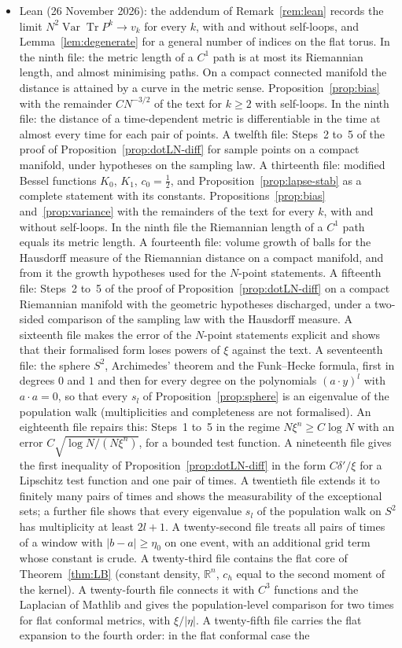 \documentclass[11pt,a4paper]{article}
\theoremstyle{stmt}
\theoremstyle{defn}
\theoremstyle{rmk}
\numberwithin{equation}{section}
\DeclareMathOperator{\Tr}{Tr}
\newcommand{\R}{\mathbb{R}}
\begin{document}
\begin{itemize}
\item Lean (26 November 2026): the addendum of Remark~\ref{rem:lean} records the limit $N^2\operatorname{Var}\Tr P^k\to v_k$ for every $k$, with and without self-loops, and Lemma~\ref{lem:degenerate} for a general number of indices on the flat torus. In the ninth file: the metric length of a $C^1$ path is at most its Riemannian length, and almost minimising paths. On a compact connected manifold the distance is attained by a curve in the metric sense. Proposition~\ref{prop:bias} with the remainder $CN^{-3/2}$ of the text for $k\ge2$ with self-loops. In the ninth file: the distance of a time-dependent metric is differentiable in the time at almost every time for each pair of points. A twelfth file: Steps~2 to~5 of the proof of Proposition~\ref{prop:dotLN-diff} for sample points on a compact manifold, under hypotheses on the sampling law. A thirteenth file: modified Bessel functions $K_0$, $K_1$, $c_0=\frac12$, and Proposition~\ref{prop:lapse-stab} as a complete statement with its constants. Propositions~\ref{prop:bias} and~\ref{prop:variance} with the remainders of the text for every $k$, with and without self-loops. In the ninth file the Riemannian length of a $C^1$ path equals its metric length. A fourteenth file: volume growth of balls for the Hausdorff measure of the Riemannian distance on a compact manifold, and from it the growth hypotheses used for the $N$-point statements. A fifteenth file: Steps~2 to~5 of the proof of Proposition~\ref{prop:dotLN-diff} on a compact Riemannian manifold with the geometric hypotheses discharged, under a two-sided comparison of the sampling law with the Hausdorff measure. A sixteenth file makes the error of the $N$-point statements explicit and shows that their formalised form loses powers of $\xi$ against the text. A seventeenth file: the sphere $S^2$, Archimedes' theorem and the Funk--Hecke formula, first in degrees $0$ and $1$ and then for every degree on the polynomials $(a\cdot y)^l$ with $a\cdot a=0$, so that every $s_l$ of Proposition~\ref{prop:sphere} is an eigenvalue of the population walk (multiplicities and completeness are not formalised). An eighteenth file repairs this: Steps~1 to~5 in the regime $N\xi^n\ge C\log N$ with an error $C\sqrt{\log N/(N\xi^n)}$, for a bounded test function. A nineteenth file gives the first inequality of Proposition~\ref{prop:dotLN-diff} in the form $C\delta'/\xi$ for a Lipschitz test function and one pair of times. A twentieth file extends it to finitely many pairs of times and shows the measurability of the exceptional sets; a further file shows that every eigenvalue $s_l$ of the population walk on $S^2$ has multiplicity at least $2l+1$. A twenty-second file treats all pairs of times of a window with $|b-a|\ge\eta_0$ on one event, with an additional grid term whose constant is crude. A twenty-third file contains the flat core of Theorem~\ref{thm:LB} (constant density, $\R^n$, $c_h$ equal to the second moment of the kernel). A twenty-fourth file connects it with $C^3$ functions and the Laplacian of Mathlib and gives the population-level comparison for two times for flat conformal metrics, with $\xi/|\eta|$. A twenty-fifth file carries the flat expansion to the fourth order: in the flat conformal case the 
\end{itemize}
\end{document}
